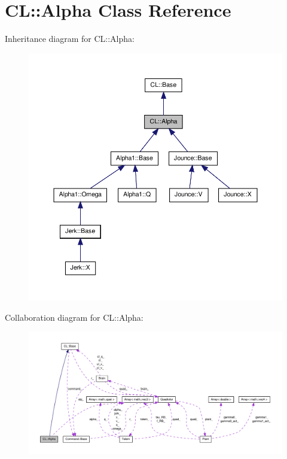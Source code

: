 \hypertarget{classCL_1_1Alpha}{\section{\-C\-L\-:\-:\-Alpha \-Class \-Reference}
\label{classCL_1_1Alpha}
}


\-Inheritance diagram for \-C\-L\-:\-:\-Alpha\-:\nopagebreak
\begin{figure}[H]
\begin{center}
\leavevmode
\includegraphics[width=350pt]{classCL_1_1Alpha__inherit__graph}
\end{center}
\end{figure}


\-Collaboration diagram for \-C\-L\-:\-:\-Alpha\-:\nopagebreak
\begin{figure}[H]
\begin{center}
\leavevmode
\includegraphics[width=350pt]{classCL_1_1Alpha__coll__graph}
\end{center}
\end{figure}

